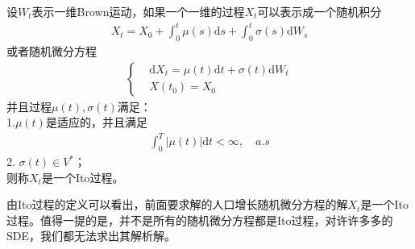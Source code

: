             \begin{definition}[Ito过程]
                设$W_t$表示一维Brown运动，如果一个一维的过程$X_t$可以表示成一个随机积分
                \begin{align*}
                    X_t = X_0 +\int_0^t \mu(s)\mathrm{d}s + \int_0^t \sigma(s) \mathrm{d}W_s
                \end{align*}
                或者随机微分方程
                \begin{align*}
                    \left\{
                        \begin{aligned}
                            &\mathrm{d}X_t = \mu(t)\mathrm{d}t + \sigma(t) \mathrm{d}W_t\\
                            &X(t_0) = X_0
                        \end{aligned}
                    \right.
                \end{align*}
                并且过程$\mu(t),\sigma(t)$满足：\\
                1.$\mu(t)$是适应的，并且满足
                \begin{align*}
                    \int_0^T |\mu(t)|\mathrm{d}t < \infty,\quad a.s
                \end{align*}
                2. $\sigma(t)\in V^*$；\\
                则称$X_t$是一个Ito过程。
            \end{definition}
            \par
            由Ito过程的定义可以看出，前面要求解的人口增长随机微分方程的解$X_t$是一个Ito过程。值得一提的是，并不是所有的随机微分方程都是Ito过程，对许许多多的SDE，我们都无法求出其解析解。
